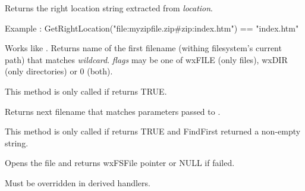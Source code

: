 Returns the right location string extracted from {\it location}. 

Example : GetRightLocation("file:myzipfile.zip\#zip:index.htm") == "index.htm"

\label{wxfilesystemfindfirst}


Works like . Returns name of the first
filename (withing filesystem's current path) that matches {\it wildcard}. {\it flags} may be one of
wxFILE (only files), wxDIR (only directories) or 0 (both).

This method is only called if  returns TRUE.

\label{wxfilesystemfindnext}


Returns next filename that matches parameters passed to .

This method is only called if  returns TRUE and FindFirst
returned a non-empty string.

\label{wxfilesystemhandleropenfile}


Opens the file and returns wxFSFile pointer or NULL if failed.

Must be overridden in derived handlers.




